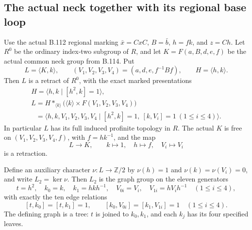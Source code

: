 \subsection*{The actual neck together with its regional base loop}

\label{stmt:B117}
Use the actual B.112 regional marking
$\bar x=CxC$, $B=\bar b$, $h=fk$, and $z=Ch$.
Let $R^0$ be the ordinary index-two subgroup of $R$, and let
$K=F(a,B,d,e,f)$ be the actual common neck group from B.114.
Put
\begin{equation}\label{eq:B117-actual-generators}
 L=\langle K,k\rangle,\qquad
 (V_1,V_2,V_3,V_4)=(a,d,e,f^{-1}Bf),\qquad H=\langle h,k\rangle.
\end{equation}
Then $L$ is a retract of $R^0$, with the exact marked presentations
\begin{equation}\label{eq:B117-L-presentation}
 \begin{gathered}
 H=\langle h,k\mid[h^2,k]=1\rangle,\\
 L=H*_{\langle k\rangle}
           \bigl(\langle k\rangle\times F(V_1,V_2,V_3,V_4)\bigr)\\
 \phantom{L}
 =\langle h,k,V_1,V_2,V_3,V_4\mid
       [h^2,k]=1,\ [k,V_i]=1\ (1\leq i\leq4)\rangle.
 \end{gathered}
\end{equation}
In particular $L$ has its full induced profinite topology in $R$.
The actual $K$ is free on $(V_1,V_2,V_3,V_4,f)$, with $f=hk^{-1}$,
and the map
\begin{equation}\label{eq:B117-K-retraction}
 L\longrightarrow K,\qquad k\longmapsto1,\quad h\longmapsto f,
 \quad V_i\longmapsto V_i
\end{equation}
is a retraction.

Define an auxiliary character $\nu:L\to\mathbb Z/2$ by
$\nu(h)=1$ and $\nu(k)=\nu(V_i)=0$, and write $L_2=\ker\nu$.
Then $L_2$ is the graph group on the eleven generators
\begin{equation}\label{eq:B117-tree-generators}
 t=h^2,\quad k_0=k,\quad k_1=hkh^{-1},\quad
 V_{0i}=V_i,\quad V_{1i}=hV_i h^{-1}\quad(1\leq i\leq4),
\end{equation}
with exactly the ten edge relations
\begin{equation}\label{eq:B117-tree-edges}
 [t,k_0]=[t,k_1]=1,\qquad
 [k_0,V_{0i}]=[k_1,V_{1i}]=1\quad(1\leq i\leq4).
\end{equation}
The defining graph is a tree: $t$ is joined to $k_0,k_1$, and
each $k_j$ has its four specified leaves.

